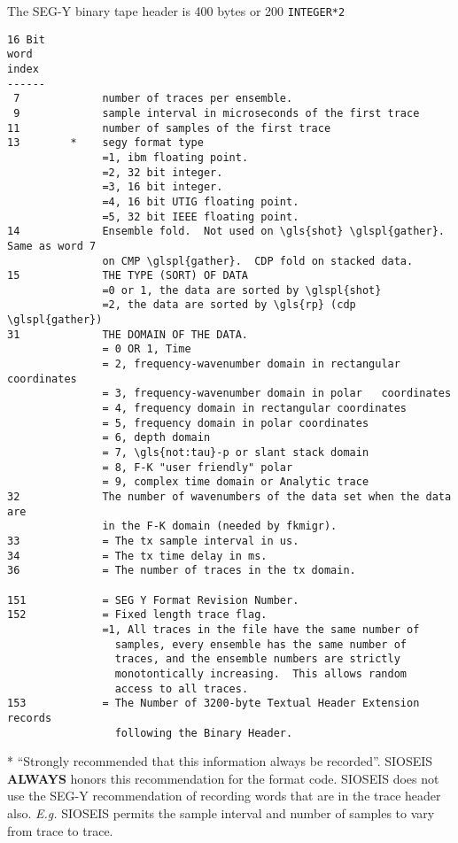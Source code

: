 The SEG-Y binary tape header is 400 bytes or 200 \texttt{INTEGER*2}

\begin{verbatim}
16 Bit
word
index
------
 7             number of traces per ensemble.
 9             sample interval in microseconds of the first trace
11             number of samples of the first trace
13        *    segy format type
               =1, ibm floating point.
               =2, 32 bit integer.
               =3, 16 bit integer.
               =4, 16 bit UTIG floating point.
               =5, 32 bit IEEE floating point.
14             Ensemble fold.  Not used on \gls{shot} \glspl{gather}.  Same as word 7
               on CMP \glspl{gather}.  CDP fold on stacked data.
15             THE TYPE (SORT) OF DATA
               =0 or 1, the data are sorted by \glspl{shot}
               =2, the data are sorted by \gls{rp} (cdp \glspl{gather})
31             THE DOMAIN OF THE DATA.
               = 0 OR 1, Time
               = 2, frequency-wavenumber domain in rectangular coordinates
               = 3, frequency-wavenumber domain in polar   coordinates
               = 4, frequency domain in rectangular coordinates
               = 5, frequency domain in polar coordinates
               = 6, depth domain
               = 7, \gls{not:tau}-p or slant stack domain
               = 8, F-K "user friendly" polar
               = 9, complex time domain or Analytic trace
32             The number of wavenumbers of the data set when the data are
               in the F-K domain (needed by fkmigr).
33             = The tx sample interval in us.
34             = The tx time delay in ms.
36             = The number of traces in the tx domain.

151            = SEG Y Format Revision Number.
152            = Fixed length trace flag.
               =1, All traces in the file have the same number of
                 samples, every ensemble has the same number of
                 traces, and the ensemble numbers are strictly
                 monotontically increasing.  This allows random
                 access to all traces.
153            = The Number of 3200-byte Textual Header Extension records
                 following the Binary Header.
\end{verbatim}
* \enquote{Strongly recommended that this information always be recorded}.
  SIOSEIS \textbf{ALWAYS} honors this recommendation for the format code.
  SIOSEIS does not use the SEG-Y recommendation of recording words
  that are in the trace header also. \textit{E.g.} SIOSEIS permits the
  sample interval and number of samples to vary from trace to trace.

